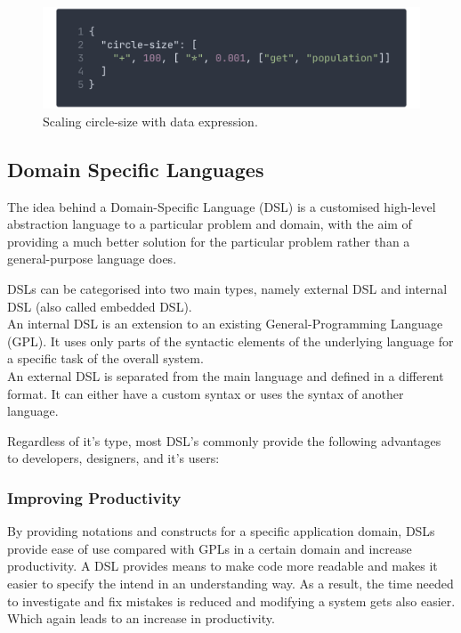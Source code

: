 \documentclass[conference]{IEEEtran}
\begin{document}
\begin{figure}
    \centering
    \includegraphics[width=\columnwidth]{img/circlesize.png}
    \caption{Scaling circle-size with data expression.}
    \label{fig:exp1}
\end{figure}

\subsection{Domain Specific Languages}

The idea behind a Domain-Specific Language (DSL) is a customised high-level abstraction language to a particular problem and domain, with the aim of providing a much better solution for the particular problem rather than a general-purpose language does\cite{van2000domain}.


DSLs can be categorised into two main types, namely  external DSL and internal DSL (also called embedded DSL).  
\\
An internal DSL is an extension to an existing General-Programming Language (GPL). It uses only parts of the syntactic elements
of the underlying language for a specific task of the overall system\cite{fowler2010domain}. 
\\
An external DSL is separated from the main language and defined in a different format. It can either have a custom syntax or uses the syntax of another language\cite{zdun2010dsl}.

Regardless of it's type, most DSL's commonly provide the following advantages to developers, designers, and it's users:

\subsubsection{Improving Productivity}
By providing notations and constructs for a specific application domain, DSLs provide ease of use compared with GPLs in a certain domain and increase productivity\cite{10.1145/1118890.1118892}. A DSL provides means to make code more readable and makes it easier to specify the intend in an understanding way. As a result, the time needed to investigate and fix mistakes is reduced and modifying a system gets also easier. Which again leads to an increase in productivity.
\end{document}
